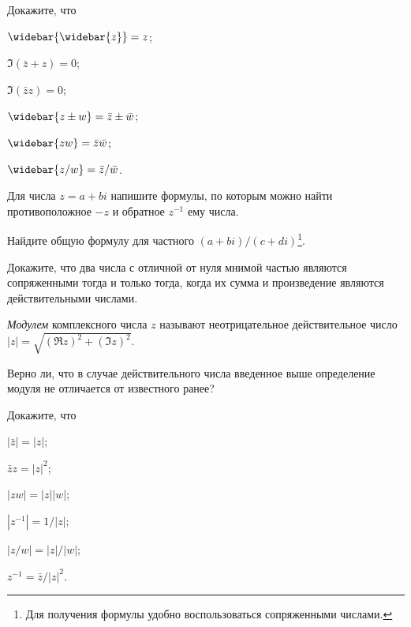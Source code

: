 \documentclass[a4paper, 12pt, num=21]{listok}
\begin{document}
\begin{problem}
	Докажите, что
	\begin{multienum}{3}
		\item \( \widebar{\widebar{z}}  = z\);
		\item \( \Im(\bar z + z) = 0\);
		\item \( \Im(\bar zz) = 0\);
		\item \( \widebar{ z \pm w} = \bar z \pm \bar w\);
		\item \( \widebar{zw} = \bar z \bar w \);
		\item \( \widebar{z/w} = \bar z/ \bar w\).
	\end{multienum}
\end{problem}
\begin{problem}
	Для числа $z = a + bi$ напишите формулы, по которым можно найти противоположное $-z$ и обратное $z^{-1}$ ему числа.
\end{problem}
\begin{problem}
	Найдите общую формулу для частного $(a + bi)/(c + di)$\footnote{Для получения формулы удобно воспользоваться сопряженными числами.}.
\end{problem}
\begin{problem}
	Докажите, что два числа с отличной от нуля мнимой частью являются сопряженными
	тогда и только тогда, когда их сумма и произведение являются действительными числами.
\end{problem}
\begin{definition}
	\textit{Модулем} комплексного числа $z$ называют неотрицательное действительное число $|z| = \sqrt{{(\Re z)}^2 + {(\Im z)}^2}$.
\end{definition}
\begin{problem}
	Верно ли, что в случае действительного числа введенное выше определение модуля не отличается от известного ранее?
\end{problem}
\begin{problem}
	Докажите, что
	\begin{multienum}{3}
		\item $|\bar z| = |z|$;
		\item $\bar zz = |z|^2$;
		\item $|zw| = |z||w|$;
		\item $|z^{-1}| = 1/|z|$;
		\item $|z/w| = |z|/|w|$;
		\item $z^{-1} = \bar z/|z|^2$.
	\end{multienum}
\end{problem}
\end{document}
